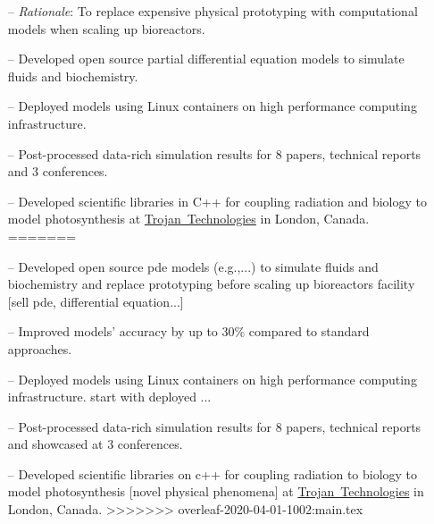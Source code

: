 \documentclass[10pt,a4paper]{altacv}
\begin{document}
\begin{itemize}
<<<<<<< HEAD:cv.tex
    \setlength{\itemindent}{0.3em}
    \item[--]  \small{\textit{Rationale}: To replace expensive physical 
    prototyping with computational models when scaling up bioreactors.}
    \item[--]   \small{Developed open source partial differential equation
    models to simulate fluids and biochemistry.} 
    \item[--] \small{Deployed models using Linux containers 
    on high performance computing infrastructure.}
    \item[--]  \small{Post-processed data-rich simulation results for 8 papers, 
    technical reports and 3 conferences.}
    \item[--]   \small{Developed scientific libraries in C++ for coupling 
    radiation and biology to model photosynthesis at 
    \href{https://www.trojantechnologies.com/}{Trojan~Technologies} 
    in London, Canada.}
=======
    \setlength{\itemindent}{0.5em}
    \item[--]   \small{Developed open source pde models (e.g.,...) to simulate fluids and biochemistry and replace prototyping before scaling up bioreactors facility [sell pde, differential equation...]} 
    \item[--] \small{Improved models' accuracy by up to 30\% compared to standard approaches.}
    \item[--] \small{Deployed models using Linux containers on high performance computing infrastructure.  start with deployed ...}
    \item[--]  \small{Post-processed data-rich simulation results for 8 papers, technical reports and showcased at 3 conferences.}
    \item[--]   \small{Developed scientific libraries on c++ for coupling radiation to biology to model photosynthesis [novel physical phenomena] at \href{https://www.trojantechnologies.com/}{Trojan~Technologies} in London, Canada.}
>>>>>>> overleaf-2020-04-01-1002:main.tex
\end{itemize}
\divider\smallskip
\end{document}
